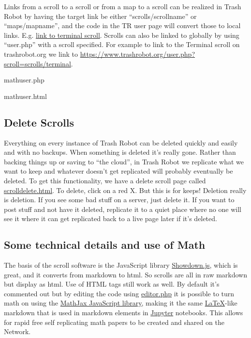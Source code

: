 Links from a scroll to a scroll or from a map to a scroll can be
realized in Trash Robot by having the target link be either
``scrolls/scrollname'' or ``maps/mapname'', and the code in the TR user
page will convert those to local links. E.g.
\href{scrolls/terminal}{link to terminal scroll}. Scrolls can also be
linked to globally by using ``user.php'' with a scroll specified. For
example to link to the Terminal scroll on trashrobot.org we link to
\url{https://www.trashrobot.org/user.php?scroll=scrolls/terminal}.

mathuser.php

mathuser.html

\subsection{Delete Scrolls}\label{delete-scrolls}

Everything on every instance of Trash Robot can be deleted quickly and
easily and with no backups. When something is deleted it's really gone.
Rather than backing things up or saving to ``the cloud'', in Trash Robot
we replicate what we want to keep and whatever doesn't get replicated
will probably eventually be deleted. To get this functionality, we have
a delete scroll page called \url{scrolldelete.html}. To delete, click on
a red X. But this is for keeps! Deletion really is deletion. If you see
some bad stuff on a server, just delete it. If you want to post stuff
and not have it deleted, replicate it to a quiet place where no one will
see it where it can get replicated back to a live page later if it's
deleted.

\subsection{Some technical details and use of
Math}\label{some-technical-details-and-use-of-math}

The basis of the scroll software is the JavaScript library
\href{http://showdownjs.com/}{Showdown.js}, which is great, and it
converts from markdown to html. So scrolls are all in raw markdown but
display as html. Use of HTML tags still work as well. By default it's
commented out but by editing the code using \url{editor.php} it is
possible to turn math on using the
\href{https://www.mathjax.org/}{MathJax JavaScript library}, making it
the same \href{https://www.latex-project.org/}{LaTeX}-like markdown that
is used in markdown elements in \href{https://jupyter.org/}{Jupyter}
notebooks. This allows for rapid free self replicating math papers to be
created and shared on the Network.

